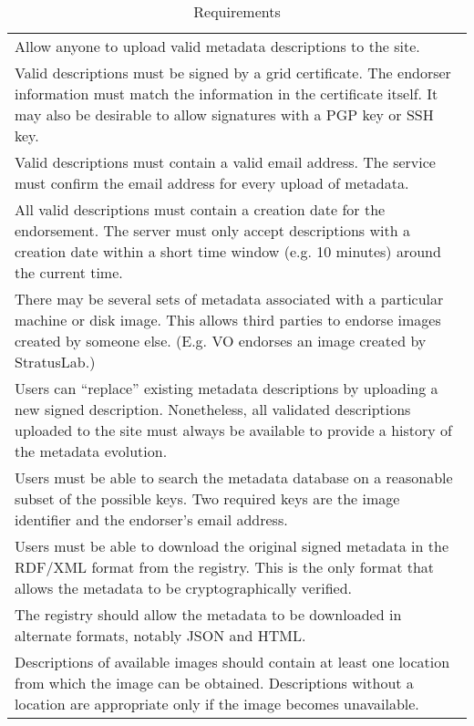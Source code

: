 \begin{table}
\caption{Requirements}
\label{tab:requirements}
\begin{tabular}{p{}}
\hline\hline
Allow anyone to upload valid metadata descriptions to the site.

\\ Valid descriptions must be signed by a grid certificate.  The
  endorser information must match the information in the certificate
  itself.  It may also be desirable to allow signatures with a PGP key
  or SSH key.

\\ Valid descriptions must contain a valid email address.  The
  service must confirm the email address for every upload of metadata.

\\ All valid descriptions must contain a creation date for the
  endorsement.  The server must only accept descriptions with a
  creation date within a short time window (e.g. 10 minutes) around
  the current time.

\\ There may be several sets of metadata associated with a
  particular machine or disk image. This allows third parties to
  endorse images created by someone else. (E.g. VO endorses an image
  created by StratusLab.)

\\ Users can ``replace'' existing metadata descriptions by
  uploading a new signed description.  Nonetheless, all validated
  descriptions uploaded to the site must always be available to
  provide a history of the metadata evolution.

\\ Users must be able to search the metadata database on a
  reasonable subset of the possible keys.  Two required keys are the
  image identifier and the endorser's email address.

\\ Users must be able to download the original signed metadata in
  the RDF/XML format from the registry.  This is the only format that
  allows the metadata to be cryptographically verified.

\\ The registry should allow the metadata to be downloaded in
  alternate formats, notably JSON and HTML.

\\ Descriptions of available images should contain at least one
  location from which the image can be obtained.  Descriptions without
  a location are appropriate only if the image becomes unavailable.


\end{tabular}
\end{table}
